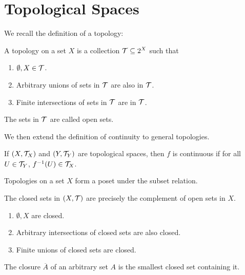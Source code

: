 \chapter{Topological Spaces}

We recall the definition of a topology:

\begin{definition}[Topology]
    A topology on a set $X$ is a collection $\mathcal T \subseteq 2^X$ such that \begin{enumerate}
        \item $\emptyset, X \in \mathcal T$.
        \item Arbitrary unions of sets in $\mathcal T$ are also in $\mathcal T$.
        \item Finite intersections of sets in $\mathcal T$ are in $\mathcal T$.
    \end{enumerate}

    The sets in $\mathcal T$ are called open sets.
\end{definition}

We then extend the definition of continuity to general topologies.
\begin{definition}[Continuity]
    If $(X, \mathcal T_X)$ and $(Y, \mathcal T_Y)$ are topological spaces, then $f$ is continuous if for all $U \in \mathcal T_Y$, $f^{-1}(U) \in \mathcal T_X$.
\end{definition}

Topologies on a set $X$ form a poset under the subset relation.

\begin{definition}
    The closed sets in $(X, \mathcal T)$ are precisely the complement of open sets in $X$.
\end{definition}

\begin{proposition}
    \begin{enumerate}
        \item $\emptyset, X$ are closed.
        \item Arbitrary intersections of closed sets are also closed.
        \item Finite unions of closed sets are closed.
    \end{enumerate}
\end{proposition}

\begin{definition}[Closure]
    The closure $\overline A$ of an arbitrary set $A$ is the smallest closed set containing it.
\end{definition}

